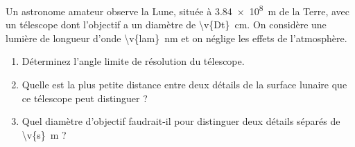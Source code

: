 Un astronome amateur observe la Lune, située à \qty{3.84e8}{m} de la Terre, avec un télescope dont l'objectif a un diamètre de \qty{\v{Dt}}{cm}. On considère une lumière de longueur d'onde \qty{\v{lam}}{nm} et on néglige les effets de l'atmosphère.

\begin{enumerate}[label=\alph*)]
    \item Déterminez l'angle limite de résolution du télescope.
    \item Quelle est la plus petite distance entre deux détails de la surface lunaire que ce télescope peut distinguer ?
    \item Quel diamètre d'objectif faudrait-il pour distinguer deux détails séparés de \qty{\v{s}}{m} ?
\end{enumerate}
